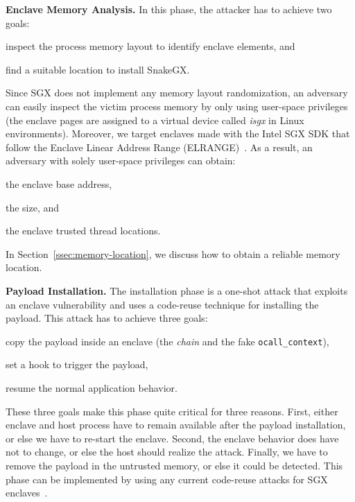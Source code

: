 \textbf{Enclave Memory Analysis.}
In this phase, the attacker has to achieve two goals:
\begin{enumerate*}[label=(\roman*)]
	\item inspect the process memory layout to identify enclave elements, and
	\item find a suitable location to install SnakeGX.
\end{enumerate*}
Since SGX does not implement any memory layout randomization, an adversary
can easily inspect the victim process memory by only using user-space 
privileges (\eg the enclave pages are assigned to a virtual device called 
\emph{isgx} in Linux environments).
Moreover, we target enclaves made with the Intel SGX SDK that follow the 
Enclave Linear Address Range (ELRANGE)~\cite{costan2016intel}.
As a result, an adversary with solely user-space privileges can obtain:
\begin{enumerate*}[label=(\roman*)]
	\item the enclave base address,
	\item the size, and
	\item the enclave trusted thread locations.
\end{enumerate*}
In Section~\ref{ssec:memory-location}, we discuss how to obtain a reliable 
memory location.

\textbf{Payload Installation.}
The installation phase is a one-shot attack that exploits an enclave 
vulnerability and uses a code-reuse technique for installing the payload.
This attack has to achieve three goals:
\begin{enumerate*}[label=(\roman*)]
	\item copy the payload inside an enclave (\eg the \emph{chain} and the 
	fake \texttt{ocall\_context}),
	\item set a hook to trigger the payload,
	\item resume the normal application behavior.
\end{enumerate*}
These three goals make this phase quite critical for three reasons. 
First, either enclave and host process have to remain available after the 
payload installation, or else we have to re-start the enclave.
Second, the enclave behavior does have not to change, or else the host should 
realize the attack.
Finally, we have to remove the payload in the untrusted memory, or else it 
could be detected.
This phase can be implemented by using any current code-reuse attacks for SGX
enclaves~\cite{lee2017hacking,biondo2018guard}.

